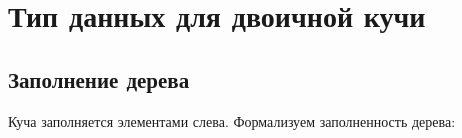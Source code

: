 \section{Тип данных для двоичной кучи}

\subsection{Заполнение дерева}
Куча заполняется элементами слева. Формализуем \cite{HeapFill} заполненность дерева:

